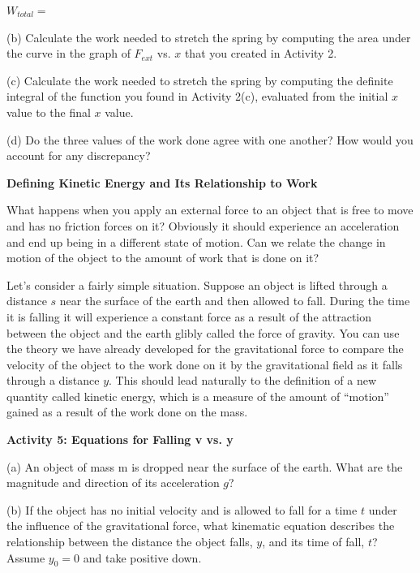 \( W_{total} =\) 
\vspace{5mm}

(b) Calculate the work needed to stretch the spring by computing the area under
the curve in the graph of \( F_{ext} \) vs. $x$ that you created in Activity 2.
\vspace{20mm}

(c) Calculate the work needed to stretch the spring by computing the definite 
integral of the function you found in Activity 2(c), evaluated from the 
initial $x$ value to the final $x$ value.
\vspace{20mm}

(d) Do the three values of the work done agree with one another? How would 
you account for any discrepancy?
\vspace{20mm}


\textbf{Defining Kinetic Energy and Its Relationship to Work} 

What happens when you apply an external force to an object that is free to move
and has no friction forces on it? Obviously it should experience an acceleration
and end up being in a different state of motion. Can we relate the change in
motion of the object to the amount of work that is done on it?

Let's consider a fairly simple situation. Suppose an object is lifted through
a distance $s$ near the surface of the earth and then allowed to fall. During
the time it is falling it will experience a constant force as a result of the
attraction between the object and the earth glibly called the force of gravity.
You can use the theory we have already developed for the gravitational force
to compare the velocity of the object to the work done on it by the gravitational
field as it falls through a distance 
$y$. This should lead naturally to the definition
of a new quantity called kinetic energy, which is a measure of the amount of
``motion'' gained as a result of the work done on the mass. 

\textbf{Activity 5: Equations for Falling v vs. y }

(a) An object of mass m is dropped near the surface of the earth. What are the
magnitude and direction of its acceleration $g$?
\vspace{10mm}

(b) If the object has no initial velocity and is allowed to fall for a time
$t$ under the influence of the gravitational force, what kinematic equation describes the relationship between the distance the object falls, $y$, and its time of fall, $t$? Assume \( y_{0}=0 \) and take positive down.
\vspace{10mm}

